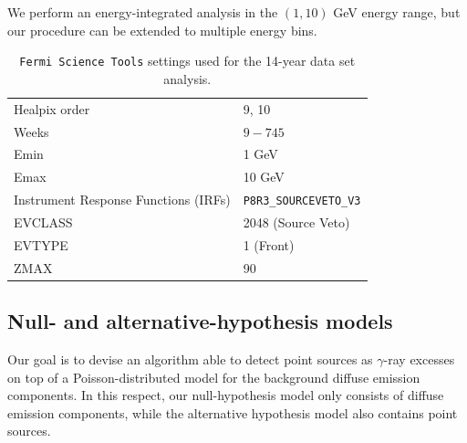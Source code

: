 \documentclass{article}
\newcommand{\g}{$\gamma$}
\begin{document}
We perform an energy-integrated analysis in the $(1,10)$ GeV energy range, but our procedure can be  extended to multiple energy bins.

\begin{table}[t]
\centering
\begin{tabular}{ | l| l|  }
\hline
Healpix order & 9, 10  \\ 
Weeks & $9-745$  \\ 
Emin & 1 GeV \\
Emax & 10 GeV \\
Instrument Response Functions (IRFs) & \verb|P8R3_SOURCEVETO_V3| \\
EVCLASS & 2048 (Source Veto)  \\ 
EVTYPE & 1 (Front)  \\
ZMAX & 90 \\
\hline
\end{tabular}
\caption{\texttt{Fermi Science Tools} settings used for the 14-year data set analysis. }
\label{tab:settings}
\end{table}

\subsection{Null- and alternative-hypothesis models}

Our goal is to devise an algorithm able to detect point sources as \g-ray excesses
on top of a Poisson-distributed model for the background diffuse emission components. 
In this respect, our null-hypothesis model only consists of diffuse emission components, while
the alternative hypothesis model also contains point sources. 
\end{document}
